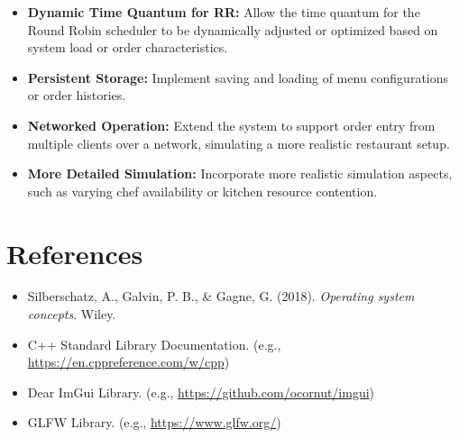 \documentclass[a4paper,12pt]{article}
\begin{document}
\begin{itemize}
\begin{itemize}
            \item \textbf{Dynamic Time Quantum for RR:} Allow the time quantum for the Round Robin scheduler to be dynamically adjusted or optimized based on system load or order characteristics.
            \item \textbf{Persistent Storage:} Implement saving and loading of menu configurations or order histories.
            \item \textbf{Networked Operation:} Extend the system to support order entry from multiple clients over a network, simulating a more realistic restaurant setup.
            \item \textbf{More Detailed Simulation:} Incorporate more realistic simulation aspects, such as varying chef availability or kitchen resource contention.
        \end{itemize}
\end{itemize}
\newpage

\section{References}
\begin{itemize}
    \item Silberschatz, A., Galvin, P. B., & Gagne, G. (2018). \textit{Operating system concepts}. Wiley.
    \item C++ Standard Library Documentation. (e.g., \url{https://en.cppreference.com/w/cpp})
    \item Dear ImGui Library. (e.g., \url{https://github.com/ocornut/imgui})
    \item GLFW Library. (e.g., \url{https://www.glfw.org/})
\end{itemize}
\newpage
\appendix
\end{document}
